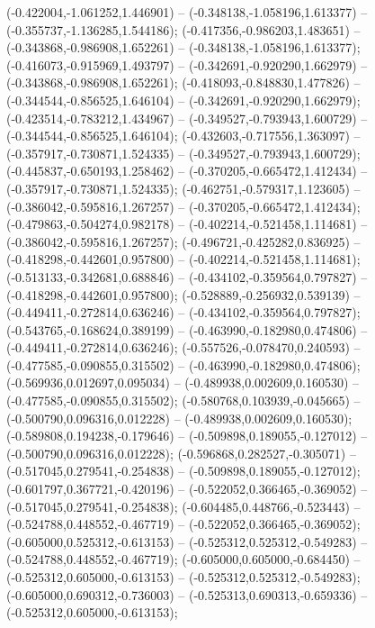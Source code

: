  (-0.422004,-1.061252,1.446901) -- (-0.348138,-1.058196,1.613377) -- (-0.355737,-1.136285,1.544186);
 (-0.417356,-0.986203,1.483651) -- (-0.343868,-0.986908,1.652261) -- (-0.348138,-1.058196,1.613377);
 (-0.416073,-0.915969,1.493797) -- (-0.342691,-0.920290,1.662979) -- (-0.343868,-0.986908,1.652261);
 (-0.418093,-0.848830,1.477826) -- (-0.344544,-0.856525,1.646104) -- (-0.342691,-0.920290,1.662979);
 (-0.423514,-0.783212,1.434967) -- (-0.349527,-0.793943,1.600729) -- (-0.344544,-0.856525,1.646104);
 (-0.432603,-0.717556,1.363097) -- (-0.357917,-0.730871,1.524335) -- (-0.349527,-0.793943,1.600729);
 (-0.445837,-0.650193,1.258462) -- (-0.370205,-0.665472,1.412434) -- (-0.357917,-0.730871,1.524335);
 (-0.462751,-0.579317,1.123605) -- (-0.386042,-0.595816,1.267257) -- (-0.370205,-0.665472,1.412434);
 (-0.479863,-0.504274,0.982178) -- (-0.402214,-0.521458,1.114681) -- (-0.386042,-0.595816,1.267257);
 (-0.496721,-0.425282,0.836925) -- (-0.418298,-0.442601,0.957800) -- (-0.402214,-0.521458,1.114681);
 (-0.513133,-0.342681,0.688846) -- (-0.434102,-0.359564,0.797827) -- (-0.418298,-0.442601,0.957800);
 (-0.528889,-0.256932,0.539139) -- (-0.449411,-0.272814,0.636246) -- (-0.434102,-0.359564,0.797827);
 (-0.543765,-0.168624,0.389199) -- (-0.463990,-0.182980,0.474806) -- (-0.449411,-0.272814,0.636246);
 (-0.557526,-0.078470,0.240593) -- (-0.477585,-0.090855,0.315502) -- (-0.463990,-0.182980,0.474806);
 (-0.569936,0.012697,0.095034) -- (-0.489938,0.002609,0.160530) -- (-0.477585,-0.090855,0.315502);
 (-0.580768,0.103939,-0.045665) -- (-0.500790,0.096316,0.012228) -- (-0.489938,0.002609,0.160530);
 (-0.589808,0.194238,-0.179646) -- (-0.509898,0.189055,-0.127012) -- (-0.500790,0.096316,0.012228);
 (-0.596868,0.282527,-0.305071) -- (-0.517045,0.279541,-0.254838) -- (-0.509898,0.189055,-0.127012);
 (-0.601797,0.367721,-0.420196) -- (-0.522052,0.366465,-0.369052) -- (-0.517045,0.279541,-0.254838);
 (-0.604485,0.448766,-0.523443) -- (-0.524788,0.448552,-0.467719) -- (-0.522052,0.366465,-0.369052);
 (-0.605000,0.525312,-0.613153) -- (-0.525312,0.525312,-0.549283) -- (-0.524788,0.448552,-0.467719);
 (-0.605000,0.605000,-0.684450) -- (-0.525312,0.605000,-0.613153) -- (-0.525312,0.525312,-0.549283);
 (-0.605000,0.690312,-0.736003) -- (-0.525313,0.690313,-0.659336) -- (-0.525312,0.605000,-0.613153);
